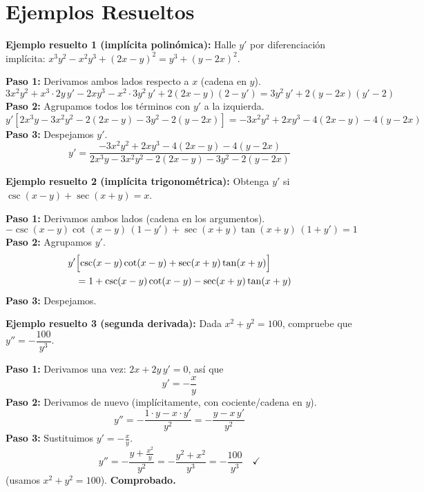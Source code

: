 \documentclass[12pt, letterpaper]{article}
\begin{document}
\newpage
\section{Ejemplos Resueltos}

\noindent\textbf{Ejemplo resuelto 1 (implícita polinómica):} Halle $y'$ por diferenciación implícita: $x^3 y^2 - x^2 y^3 + (2x-y)^2 = y^3 + (y-2x)^2$.

\begin{cuadrosolucion}
  \textbf{Paso 1:} Derivamos ambos lados respecto a $x$ (cadena en $y$).
  \[
    3x^2 y^2 + x^3\cdot 2y\,y' - 2x y^3 - x^2\cdot 3y^2\,y' + 2(2x-y)(2 - y')
    = 3y^2\,y' + 2(y-2x)(y' - 2)
  \]
  \textbf{Paso 2:} Agrupamos todos los términos con $y'$ a la izquierda.
  \[
    y'\left[2x^3 y - 3x^2 y^2 - 2(2x-y) - 3y^2 - 2(y-2x)\right]
    = -3x^2 y^2 + 2x y^3 - 4(2x-y) - 4(y-2x)
  \]
  \textbf{Paso 3:} Despejamos $y'$.
  \[
    y' = \frac{-3x^2 y^2 + 2x y^3 - 4(2x-y) - 4(y-2x)}{2x^3 y - 3x^2 y^2 - 2(2x-y) - 3y^2 - 2(y-2x)}
  \]
\end{cuadrosolucion}

\noindent\textbf{Ejemplo resuelto 2 (implícita trigonométrica):} Obtenga $y'$ si $\csc(x-y) + \sec(x+y) = x$.

\begin{cuadrosolucion}
  \textbf{Paso 1:} Derivamos ambos lados (cadena en los argumentos).
  \[
    -\csc(x-y)\cot(x-y)\,(1-y') + \sec(x+y)\tan(x+y)\,(1+y') = 1
  \]
  \textbf{Paso 2:} Agrupamos $y'$.
  \[
    \begin{aligned}
      y'&\Bigl[\csc(x-y)\cot(x-y) + \sec(x+y)\tan(x+y)\Bigr] \\
        &= 1 + \csc(x-y)\cot(x-y) - \sec(x+y)\tan(x+y)
    \end{aligned}
  \]
  \textbf{Paso 3:} Despejamos.
  \begin{center}
  \end{center}
\end{cuadrosolucion}

\noindent\textbf{Ejemplo resuelto 3 (segunda derivada):} Dada $x^2 + y^2 = 100$, compruebe que $y'' = -\dfrac{100}{y^3}$.

\begin{cuadrosolucion}
  \textbf{Paso 1:} Derivamos una vez: $2x + 2y\,y' = 0$, así que
  \[
    y' = -\frac{x}{y}
  \]
  \textbf{Paso 2:} Derivamos de nuevo (implícitamente, con cociente/cadena en $y$).
  \[
    y'' = -\frac{1\cdot y - x\cdot y'}{y^2} = -\frac{y - x\,y'}{y^2}
  \]
  \textbf{Paso 3:} Sustituimos $y' = -\frac{x}{y}$.
  \[
    y'' = -\frac{y + \frac{x^2}{y}}{y^2} = -\frac{y^2 + x^2}{y^3} = -\frac{100}{y^3} \quad \checkmark
  \]
  (usamos $x^2 + y^2 = 100$). \textbf{Comprobado.}
\end{cuadrosolucion}
\end{document}
